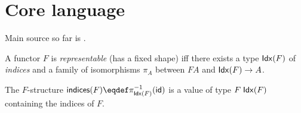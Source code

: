 \section{Core language}

Main source so far is \citet{gibbons17}.




\begin{definition}
   A functor $F$ is \emph{representable} (has a fixed shape) iff there exists a type $\textup{\textsf{Idx}}(F)$ of \emph{indices} and a family of isomorphisms $\pi_A$ between $F A$ and $\textup{\textsf{Idx}}(F) \to A$.
\end{definition}

The $F$-structure $\mathSf{indices}(F) \eqdef \pi_{\Set{Idx}(F)}^{-1}(\id)$ is a value of type $F\;\textup{\textsf{Idx}}(F)$ containing the indices of $F$.


